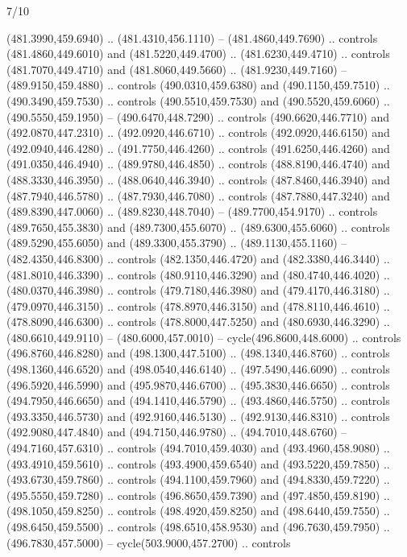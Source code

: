 \begin{flagdescription}{7/10}
\begin{scope}[xshift=0.5\flaglength]
\begin{scope}[scale=0.00185\flagwidth,yshift=245mm,xshift=-43.7mm]
\begin{scope}[y=-0.8pt, x=0.8pt, inner sep=0pt, outer sep=0pt]
\begin{scope}[shift={(-344.0678,183.89831)},fill=brown]
  (481.3990,459.6940) .. (481.4310,456.1110) -- (481.4860,449.7690) .. controls
  (481.4860,449.6010) and (481.5220,449.4700) .. (481.6230,449.4710) .. controls
  (481.7070,449.4710) and (481.8060,449.5660) .. (481.9230,449.7160) --
  (489.9150,459.4880) .. controls (490.0310,459.6380) and (490.1150,459.7510) ..
  (490.3490,459.7530) .. controls (490.5510,459.7530) and (490.5520,459.6060) ..
  (490.5550,459.1950) -- (490.6470,448.7290) .. controls (490.6620,446.7710) and
  (492.0870,447.2310) .. (492.0920,446.6710) .. controls (492.0920,446.6150) and
  (492.0940,446.4280) .. (491.7750,446.4260) .. controls (491.6250,446.4260) and
  (491.0350,446.4940) .. (489.9780,446.4850) .. controls (488.8190,446.4740) and
  (488.3330,446.3950) .. (488.0640,446.3940) .. controls (487.8460,446.3940) and
  (487.7940,446.5780) .. (487.7930,446.7080) .. controls (487.7880,447.3240) and
  (489.8390,447.0060) .. (489.8230,448.7040) -- (489.7700,454.9170) .. controls
  (489.7650,455.3830) and (489.7300,455.6070) .. (489.6300,455.6060) .. controls
  (489.5290,455.6050) and (489.3300,455.3790) .. (489.1130,455.1160) --
  (482.4350,446.8300) .. controls (482.1350,446.4720) and (482.3380,446.3440) ..
  (481.8010,446.3390) .. controls (480.9110,446.3290) and (480.4740,446.4020) ..
  (480.0370,446.3980) .. controls (479.7180,446.3980) and (479.4170,446.3180) ..
  (479.0970,446.3150) .. controls (478.8970,446.3150) and (478.8110,446.4610) ..
  (478.8090,446.6300) .. controls (478.8000,447.5250) and (480.6930,446.3290) ..
  (480.6610,449.9110) -- (480.6000,457.0010) -- cycle(496.8600,448.6000) ..
  controls (496.8760,446.8280) and (498.1300,447.5100) .. (498.1340,446.8760) ..
  controls (498.1360,446.6520) and (498.0540,446.6140) .. (497.5490,446.6090) ..
  controls (496.5920,446.5990) and (495.9870,446.6700) .. (495.3830,446.6650) ..
  controls (494.7950,446.6650) and (494.1410,446.5790) .. (493.4860,446.5750) ..
  controls (493.3350,446.5730) and (492.9160,446.5130) .. (492.9130,446.8310) ..
  controls (492.9080,447.4840) and (494.7150,446.9780) .. (494.7010,448.6760) --
  (494.7160,457.6310) .. controls (494.7010,459.4030) and (493.4960,458.9080) ..
  (493.4910,459.5610) .. controls (493.4900,459.6540) and (493.5220,459.7850) ..
  (493.6730,459.7860) .. controls (494.1100,459.7960) and (494.8330,459.7220) ..
  (495.5550,459.7280) .. controls (496.8650,459.7390) and (497.4850,459.8190) ..
  (498.1050,459.8250) .. controls (498.4920,459.8250) and (498.6440,459.7550) ..
  (498.6450,459.5500) .. controls (498.6510,458.9530) and (496.7630,459.7950) ..
  (496.7830,457.5000) -- cycle(503.9000,457.2700) .. controls

\end{scope}
\end{scope}
\end{scope}
\end{scope}
\end{flagdescription}
